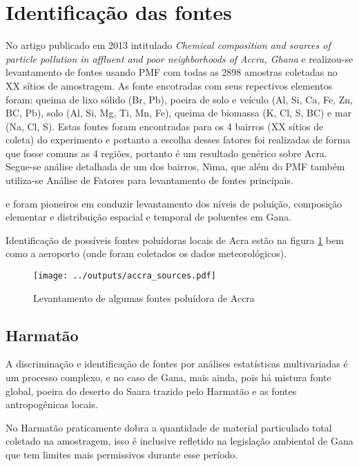\section{Identificação das fontes}

No artigo publicado em 2013 intitulado
\textit{Chemical composition and sources of particle pollution in affluent and
poor neighborhoods of Accra, Ghana} \citep{zhou2013} e \citep{zhou2014} 
realizou-se levantamento de 
fontes usando PMF com todas as 2898 amostras coletadas no XX sítios de 
amostragem. As fonte encotradas com seus repectivos elementos foram: 
queima de lixo sólido (Br, Pb), poeira de solo e veículo (Al, Si, Ca, Fe, Zn, 
BC, Pb), solo (Al, Si, Mg, Ti, Mn, Fe), queima de biomassa (K, Cl, S, BC) e mar 
(Na, Cl, S). Estas fontes foram encontradas para os 4 bairros (XX sítios de 
coleta) do experimento e portanto a escolha desses fatores foi realizadas de 
forma que fosse comuns as 4 regiões, portanto é um resultado genérico sobre 
Acra. Segue-se análise detalhada de um dos bairros, Nima, que além do PMF
também utiliza-se Análise de Fatores para levantamento de fontes principais. 

\citet{ARKU2008} e \citet{DIONISIO2010} foram pioneiros em conduzir  
levantamento dos níveis de poluição, composição elementar e 
distribuição espacial e temporal de poluentes em Gana.

Identificação de possíveis fontes poluídoras locais de Acra estão na figura 
\ref{fg:acrasources} bem como a aeroporto
(onde foram coletados os dados meteorológicos).

\begin{figure}[H]
  \centering
  \texttt{[image: ../outputs/accra\_sources.pdf]}
  \caption{Levantamento de algumas fontes poluídora de Accra \label{fg:acrasources}}
\end{figure}

\subsection{Harmatão}

A discriminação e identificação de fontes por análises estatísticas 
multivariadas é um processo complexo, e no caso de Gana, mais ainda, 
pois há mistura fonte global, poeira do deserto do Saara trazido 
pelo Harmatão e as fontes antropogênicas locais.

No Harmatão praticamente dobra a quantidade de 
material particulado total coletado na amostragem, isso é inclusive refletido na 
legislação ambiental de Gana que tem limites mais permissivos durante esse 
período. 

